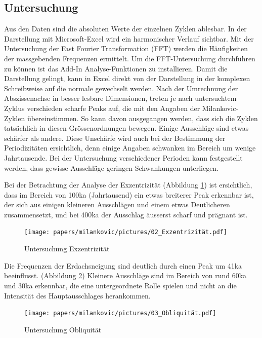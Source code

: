 \subsection{Untersuchung
\label{milankovic:subsection:Untersuchung}}
Aus den Daten sind die absoluten Werte der einzelnen Zyklen ablesbar.
In der Darstellung mit Microsoft-Excel wird ein harmonischer Verlauf sichtbar.
Mit der Untersuchung der Fast Fourier Transformation (FFT) werden die Häufigkeiten der massgebenden Frequenzen ermittelt.
Um die FFT-Untersuchung durchführen zu können ist das Add-In Analyse-Funktionen zu installieren.
Damit die Darstellung gelingt, kann in Excel direkt von der Darstellung in der komplexen Schreibweise auf die normale gewechselt werden.
Nach der Umrechnung der Abszissenachse in besser lesbare Dimensionen, treten je nach untersuchtem Zyklus verschieden scharfe Peaks auf, die mit den Angaben der Milankovic-Zyklen übereinstimmen.
So kann davon ausgegangen werden, dass sich die Zyklen tatsächlich in diesen Grössenordnungen bewegen.
Einige Ausschläge sind etwas schärfer als andere.
Diese Unschärfe wird auch bei der Bestimmung der Periodizitäten ersichtlich, denn einige Angaben schwanken im Bereich um wenige Jahrtausende.
Bei der Untersuchung verschiedener Perioden kann festgestellt werden, dass gewisse Ausschläge geringen Schwankungen unterliegen.

Bei der Betrachtung der Analyse der Exzentrizität
(Abbildung \ref{pictureUntersuchungExzentrizität})
ist ersichtlich, dass im Bereich von 100ka (Jahrtausend) ein etwas breiterer Peak erkennbar ist, der sich aus einigen kleineren Ausschlägen und einem etwas Deutlicheren zusammensetzt, und bei 400ka der Ausschlag äusserst scharf und prägnant ist.

\begin{figure}
	\centering
	\texttt{[image: papers/milankovic/pictures/02\_Exzentrizität.pdf]}
	\caption{Untersuchung Exzentrizität
		\label{pictureUntersuchungExzentrizität}}
\end{figure}

Die Frequenzen der Erdachsneigung sind deutlich durch einen Peak um 41ka beeinflusst.
	(Abbildung \ref{pictureUntersuchungObliquität})
Kleinere Ausschläge sind im Bereich von rund 60ka und 30ka erkennbar, die eine untergeordnete Rolle spielen und nicht an die Intensität des Hauptausschlages herankommen.

\begin{figure}
	\centering
	\texttt{[image: papers/milankovic/pictures/03\_Obliquität.pdf]}
	\caption{Untersuchung Obliquität
		\label{pictureUntersuchungObliquität}}
\end{figure}

